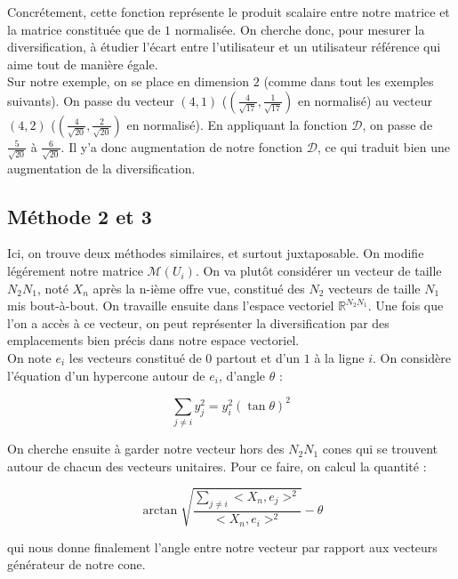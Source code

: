 \documentclass[11pt, oneside]{article}
\begin{document}
Concrétement, cette fonction représente le produit scalaire entre notre matrice et la matrice constituée que de $1$ normalisée. On cherche donc, pour mesurer la diversification, à étudier l'écart entre l'utilisateur et un utilisateur référence qui aime tout de manière égale. \\

Sur notre exemple, on se place en dimension $2$ (comme dans tout les exemples suivants). On passe du vecteur $(4,1)$ ($(\frac{4}{\sqrt{17}},\frac{1}{\sqrt{17}})$ en normalisé) au vecteur $(4,2)$ ($(\frac{4}{\sqrt{20}},\frac{2}{\sqrt{20}})$ en normalisé). En appliquant la fonction $\mathcal{D}$, on passe de $\frac{5}{\sqrt{20}}$ à $\frac{6}{\sqrt{20}}$. Il y'a donc augmentation de notre fonction $\mathcal{D}$, ce qui traduit bien une augmentation de la diversification. 



\subsection{Méthode 2 et 3}

Ici, on trouve deux méthodes similaires, et surtout juxtaposable. On modifie légérement notre matrice $\mathcal{M} (U_i)$. On va plutôt considérer un vecteur de taille $N_2 N_1$, noté $X_n$ après la n-ième offre vue, constitué des $N_2$ vecteurs de taille $N_1$ mis bout-à-bout. On travaille ensuite dans l'espace vectoriel $\mathbb{R}^{N_2 N_1}$. Une fois que l'on a accès à ce vecteur, on peut représenter la diversification par des emplacements bien précis dans notre espace vectoriel. \\
On note $e_i$ les vecteurs constitué de $0$ partout et d'un $1$ à la ligne $i$. On considère l'équation d'un hypercone autour de $e_i$, d'angle $\theta$ : 

\begin{center}
\[
\displaystyle \sum _{j \neq i} y_j ^2 = y_i ^2 (\tan{\theta}) ^2
\]
\end{center}

On cherche ensuite à garder notre vecteur hors des $N_2 N_1$ cones qui se trouvent autour de chacun des vecteurs unitaires. Pour ce faire, on calcul la quantité :

\begin{center}

\[
\arctan{\sqrt{\frac{\displaystyle \sum _{j \neq i} <X_n,e_j> ^2}{<X_n,e_i> ^2}}} - \theta
\]

\end{center}

qui nous donne finalement l'angle entre notre vecteur par rapport aux vecteurs générateur de notre cone.
\end{document}
